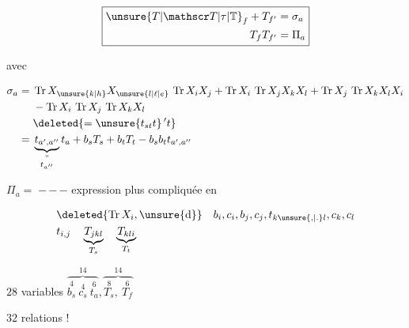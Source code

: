 

\[
 \boxed{\begin{aligned}
 \unsure{T|\mathscr T|\tau|\mathbb T}_f+T_{f'}&=\sigma_a\\
 T_fT_{f'}&=\Pi_a
 \end{aligned}}
\]

avec

\[
 \begin{aligned}
 \sigma_a={}&\operatorname{Tr}X_{\unsure{k|h}}X_{\unsure{l|\ell|e}}\,\operatorname{Tr}X_iX_j+
 \operatorname{Tr}X_i\,\operatorname{Tr}X_jX_kX_l+
 \operatorname{Tr}X_j\,\operatorname{Tr}X_kX_lX_i\\
 &-\operatorname{Tr}X_i\,\operatorname{Tr}X_j\,\operatorname{Tr}X_kX_l\\
 &\deleted{=\unsure{t_{st}t}\,'t}\\
 ={}&\underbrace{t_{a',a''}}_{\substack{\text{''}\\t_{a''}}}t_a+b_sT_s+b_tT_t-b_sb_tt_{a',a''}
 \end{aligned}
\]

$\Pi_a=\;\mathord{-}\,\mathord{-}\,\mathord{-}$ expression  plus compliquée en

\[
 \begin{aligned}
 &\deleted{\operatorname{Tr}X_i,\unsure{\mathrm d}}\quad b_i,c_i,b_j,c_j,t_{k\unsure{,|.}l},c_k,c_l\\
 &t_{i,j}\quad\underbrace{T_{jkl}}_{T_s}\quad\underbrace{T_{kli}}_{T_t}
 \end{aligned}
\]

$28$ variables $\overbrace{\overset{4}{b_s}\ \overset{4}{c_s}\ \overset{6}{t_a}}^{14}, \overbrace{\overset{8}{T_s},\ \overset{6}{T_f}}^{14}$

$32$ relations !
